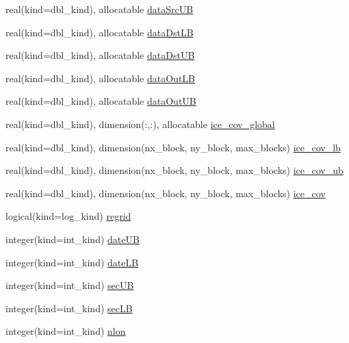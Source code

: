 \begin{DoxyCompactItemize}
real(kind=dbl\_\-kind), allocatable \hyperlink{namespaceice__prescribed__mod_a59169c4d93914baf69c59b8d5f2fb1ab}{dataSrcUB}
\item 
real(kind=dbl\_\-kind), allocatable \hyperlink{namespaceice__prescribed__mod_a69b2adaed2ac02b269e8c3c1d6b44178}{dataDstLB}
\item 
real(kind=dbl\_\-kind), allocatable \hyperlink{namespaceice__prescribed__mod_a07af024321e34db28532c6834a352da3}{dataDstUB}
\item 
real(kind=dbl\_\-kind), allocatable \hyperlink{namespaceice__prescribed__mod_a88edf4fbb0dc86b082ddf6a6c48d393a}{dataOutLB}
\item 
real(kind=dbl\_\-kind), allocatable \hyperlink{namespaceice__prescribed__mod_a0c216149ad3a2a7bd66c3bdb274c77e7}{dataOutUB}
\item 
real(kind=dbl\_\-kind), dimension(:,:), allocatable \hyperlink{namespaceice__prescribed__mod_a2bc0b66d04bc6ff5ed1c325ee6292eff}{ice\_\-cov\_\-global}
\item 
real(kind=dbl\_\-kind), dimension(nx\_\-block, ny\_\-block, max\_\-blocks) \hyperlink{namespaceice__prescribed__mod_a2f6a0d3d485195c75861395c78cc22aa}{ice\_\-cov\_\-lb}
\item 
real(kind=dbl\_\-kind), dimension(nx\_\-block, ny\_\-block, max\_\-blocks) \hyperlink{namespaceice__prescribed__mod_a9c50464ba0a337c6fd03cec3a7338897}{ice\_\-cov\_\-ub}
\item 
real(kind=dbl\_\-kind), dimension(nx\_\-block, ny\_\-block, max\_\-blocks) \hyperlink{namespaceice__prescribed__mod_ad870001a33c2597b961fde76bceca0b6}{ice\_\-cov}
\item 
logical(kind=log\_\-kind) \hyperlink{namespaceice__prescribed__mod_a794e5c02618e82554dc2cec6c635b8f1}{regrid}
\item 
integer(kind=int\_\-kind) \hyperlink{namespaceice__prescribed__mod_ad31a8b9239fb1c5cca528bc20733ba0a}{dateUB}
\item 
integer(kind=int\_\-kind) \hyperlink{namespaceice__prescribed__mod_a43e79eec4249cc4e5883bebc24835c94}{dateLB}
\item 
integer(kind=int\_\-kind) \hyperlink{namespaceice__prescribed__mod_a23c0dbac49b47681dc4939a3f8fd4100}{secUB}
\item 
integer(kind=int\_\-kind) \hyperlink{namespaceice__prescribed__mod_a1b7b4c13bf3d78d72c62fe92a9a7ebcc}{secLB}
\item 
integer(kind=int\_\-kind) \hyperlink{namespaceice__prescribed__mod_a7af5d49e5ab6fd7900aeb659387719a3}{nlon}
\item 

\end{DoxyCompactItemize}
